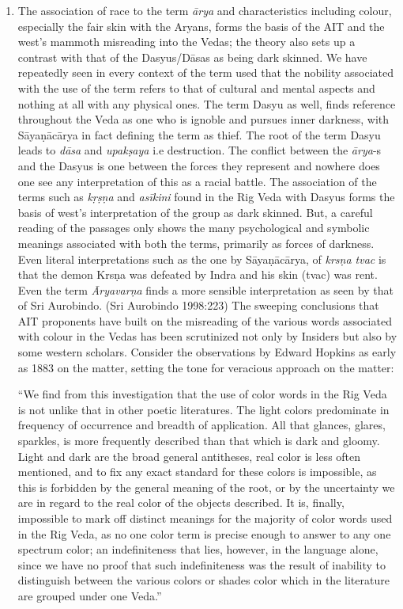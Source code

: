 \begin{enumerate}
 \item The association of race to the term \textit{ārya} and characteristics including colour, especially the fair skin with the Aryans, forms the basis of the AIT and the west’s mammoth misreading into the Vedas; the theory also sets up a contrast with that of the Dasyus/Dāsas as being dark skinned. We have repeatedly seen in every context of the term used that the nobility associated with the use of the term refers to that of cultural and mental aspects and nothing at all with any physical ones. The term Dasyu as well, finds reference throughout the Veda as one who is ignoble and pursues inner darkness, with Sāyaṇācārya in fact defining the term as thief. The root of the term Dasyu leads to \textit{dāsa} and \textit{upakṣaya} i.e destruction. The conflict between the \textit{ārya}-s and the Dasyus is one between the forces they represent and nowhere does one see any interpretation of this as a racial battle. The association of the terms such as \textit{kṛṣṇa }and \textit{asīkini} found in the Rig Veda with Dasyus forms the basis of west’s interpretation of the group as dark skinned. But, a careful reading of the passages only shows the many psychological and symbolic meanings associated with both the terms, primarily as forces of darkness. Even literal interpretations such as the one by Sāyaṇācārya, of \textit{krsṇa tvac} is that the demon Krsṇa was defeated by Indra and his skin (tvac) was rent. Even the term \textit{Āryavarṇa} finds a more sensible interpretation as seen by that of Sri Aurobindo. (Sri Aurobindo 1998:223) The sweeping conclusions that AIT proponents have built on the misreading of the various words associated with colour in the Vedas has been scrutinized not only by Insiders but also by some western scholars. Consider the observations by Edward Hopkins as early as 1883 on the matter, setting the tone for veracious approach on the matter:

\begin{myquote}
“We find from this investigation that the use of color words in the Rig Veda is not unlike that in other poetic literatures. The light colors predominate in frequency of occurrence and breadth of application. All that glances, glares, sparkles, is more frequently described than that which is dark and gloomy. Light and dark are the broad general antitheses, real color is less often mentioned, and to fix any exact standard for these colors is impossible, as this is forbidden by the general meaning of the root, or by the uncertainty we are in regard to the real color of the objects described. It is, finally, impossible to mark off distinct meanings for the majority of color words used in the Rig Veda, as no one color term is precise enough to answer to any one spectrum color; an indefiniteness that lies, however, in the language alone, since we have no proof that such indefiniteness was the result of inability to distinguish between the various colors or shades color which in the literature are grouped under one Veda.”


\end{myquote}
\end{enumerate}

